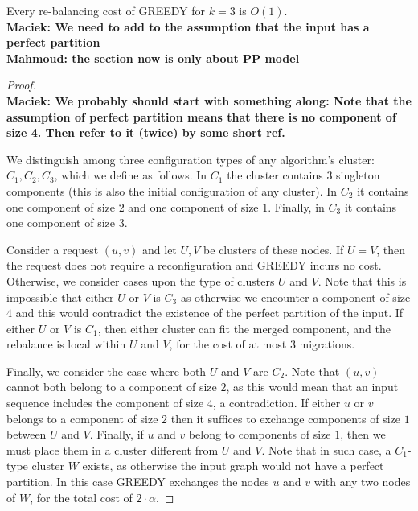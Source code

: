\documentclass[manuscript,screen=true]{acmart}
\newcommand\mahmoud[1]{\color{green}\textbf{\\ Mahmoud: #1}\\\color{black}}
\newcommand\maciek[1]{\color{brown}\textbf{\\ Maciek: #1}\color{black}}
\begin{document}
\begin{appendix}
  \begin{lemma} \label{lemma:k=3}
    Every re-balancing cost of GREEDY for $k=3$ is $O(1)$.
    \maciek{We need to add to the assumption that the input has a perfect partition
    \mahmoud{the section now is only about PP model}}
    \label{rebalancing-cost}
  \end{lemma}
  
  \begin{proof} 
  
    \maciek{We probably should start with something along: Note that the assumption of perfect partition means that there is no component of size 4. Then refer to it (twice) by some short ref.}
    
    We distinguish among three configuration types of any algorithm's cluster: $C_1, C_2, C_3$, which we define as follows. In $C_1$ the cluster contains $3$ singleton components (this is also the initial configuration of any cluster). In $C_2$ it contains one component of size $2$ and one component of size $1$. Finally, in $C_3$ it contains one component of size $3$.
  
    Consider a request $(u, v)$ and let $U, V$ be clusters of these nodes.
    If $U=V$, then the request does not require a reconfiguration and GREEDY incurs no cost.
    Otherwise, we consider cases upon the type of clusters $U$ and $V$.
    Note that this is impossible that either $U$ or $V$ is $C_3$ as otherwise we encounter a component of size $4$ and this would contradict the existence of the perfect partition of the input.
    If either $U$ or $V$ is $C_1$, then either cluster can fit the merged component, and the rebalance is local within $U$ and $V$, for the cost of at most $3$ migrations.
  
    Finally, we consider the case where both $U$ and $V$ are $C_2$. Note that $(u,v)$ cannot both belong to a component of size $2$, as this would mean that an input sequence includes the component of size $4$, a contradiction. 
    If either $u$ or $v$ belongs to a component of size $2$ then it suffices to exchange components of size $1$ between $U$ and $V$.
    Finally, if $u$ and $v$ belong to components of size $1$, then we must place them in a cluster different from $U$ and $V$.
    Note that in such case, a $C_1$-type cluster $W$ exists, as otherwise the input graph would not have a perfect partition. In this case GREEDY exchanges the nodes $u$ and $v$ with any two nodes of $W$, for the total cost of $2\cdot \alpha$.
  \end{proof}
  

\end{appendix}
\end{document}
